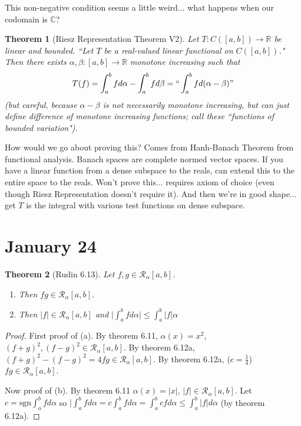 \documentclass{article}
\theoremstyle{plain}
\newtheorem{theorem}{Theorem}
\theoremstyle{remark}
\newcommand{\R}{{\mathbb R}}
\newcommand{\C}{{\mathbb C}}
\begin{document}
This non-negative condition seems a little weird...
what happens when our codomain is $\C$?
\begin{theorem}[Riesz Representation Theorem V2]
	Let $T \colon C([a,b]) \to \R$ be linear and bounded.
	``Let $T$ be a real-valued linear functional on $C([a,b])$."
	Then there exists $\alpha,\beta \colon [a,b] \to \R$ monotone increasing such that
	\[
		T(f) = \int_a^b fd\alpha - \int_a^b fd\beta = ``\int_a^bfd(\alpha-\beta)"
	\]
	(but careful, because $\alpha - \beta$ is not necessarily monotone increasing,
	but can just define difference of monotone increasing functions;
	call these ``functions of bounded variation").
\end{theorem}
How would we go about proving this?
Comes from Hanh-Banach Theorem from functional analysis.
Banach spaces are complete normed vector spaces.
If you have a linear function from a dense subspace to the reals,
can extend this to the entire space to the reals.
Won't prove this... requires axiom of choice
(even though Riesz Representation doesn't require it).
And then we're in good shape...
get $T$ is the integral with various test functions on dense subspace.

\section{January 24}

\begin{theorem}[Rudin 6.13]
	Let $f,g \in \mathcal{R}_\alpha[a,b]$.
	\begin{enumerate}
		\item[(a).] Then $fg \in \mathcal{R}_\alpha[a,b]$.
		\item[(b).] Then $\lvert f \rvert \in \mathcal{R}_\alpha[a,b]$
			and $\lvert \int_a^bfd\alpha \rvert \leq \int_a^b \lvert f \rvert \alpha$
	\end{enumerate}
\end{theorem}
\begin{proof}
	First proof of (a).
	By theorem 6.11, $\alpha(x)=x^2$, $(f+g)^2,(f-g)^2 \in \mathcal{R}_\alpha[a,b]$.
	By theorem 6.12a, $(f+g)^2-(f-g)^2 = 4fg \in \mathcal{R}_\alpha[a,b]$.
	By theorem 6.12a, ($c = \frac14$) $fg \in \mathcal{R}_\alpha[a,b]$.

	Now proof of (b).
	By theorem 6.11 $\alpha(x) = \lvert x \rvert$, $\lvert f \rvert \in \mathcal{R}_\alpha[a,b]$.
	Let $c = \mathrm{sgn}\int_a^b fd\alpha$ so
	$\lvert \int_a^b fd\alpha = c\int_a^bfd\alpha = \int_a^bcfd\alpha
	\leq \int_a^b \lvert f \rvert d\alpha$ (by theorem 6.12a).
\end{proof}
\end{document}
